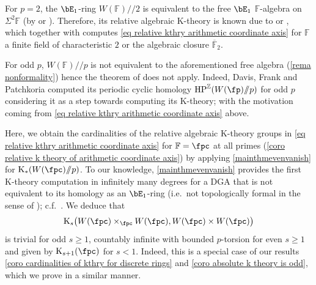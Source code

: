 \documentclass[english,10pt]{amsart}
\newcommand{\field}{\mathbb{F}}
\theoremstyle{definition}
\numberwithin{equation}{section}
\newcommand{\mmod}{/\!\!/}
\newcommand{\sslash}{\mmod}
\newcommand{\z}{\mathbb{Z}}
\begin{document}
For $p=2$, the $\bE_1$-ring $W(\field) \sslash 2$ is equivalent to the free $\bE_1$ $\field$-algebra on $\Sigma^2 \field$ (by \cite[Remark 4.33]{land2023kthrypushouts} or \cite[Theorem B]{bayindir2025towards}). Therefore, its relative algebraic K-theory is known due to \cite{bayindir2020kthryofthh} or \cite[Example 4.29]{land2023kthrypushouts}, which together with \cite{Qui72} computes \eqref{eq relative kthry arithmetic coordinate axis} for $\field$ a finite field of characteristic $2$ or the algebraic closure $\overline{\mathbb{F}}_2$.  

For odd $p$, $W(\field)\sslash p$ is not equivalent to the aforementioned free algebra (\autoref{rema nonformality}) hence the theorem of \cite{bayindir2020kthryofthh} does not apply. Indeed, Davis, Frank and Patchkoria \cite{davis2025cyclichomologyofzmodmodp} computed its  periodic cyclic homology $\textup{HP}^{\z}(W(\fp) \sslash p)$ for odd $p$ considering it as a step towards computing its K-theory; with the motivation coming from \eqref{eq relative kthry arithmetic coordinate axis} above. 

Here, we obtain the cardinalities of the relative algebraic K-theory groups in \eqref{eq relative kthry arithmetic coordinate axis} for $\field = \fpc$ at all primes (\autoref{coro relative k theory of arithmetic coordinate axis}) by applying \autoref{mainthmevenvanish} for  $\mathrm{K}_*(W(\fpc) \sslash p)$. To our knowledge, \autoref{mainthmevenvanish} provides the first K-theory computation in infinitely many degrees for a DGA that is not  equivalent to its homology as an $\bE_1$-ring (i.e.\ not topologically formal in the sense of \cite{bayindir2025towards, dugger2007topologicalequivalences}); c.f.\ \cite{schlicting2002noteontriangulatedcat,dugger2009curious}. We deduce that  
\[\mathrm{K}_s\big(W(\fpc) \times_{\fpc}
W(\fpc), W(\fpc) \times W(\fpc)\big)\]
is trivial for odd $s\geq 1$,  countably infinite with bounded $p$-torsion for even $s \geq 1$ and given by $\mathrm{K}_{s+1}(\fpc)$ for $s<1$. Indeed, this is a special case of our results \autoref{coro cardinalities of kthry for discrete rings} and \autoref{coro absolute k theory is odd}, which we prove in a similar manner. 
\end{document}
